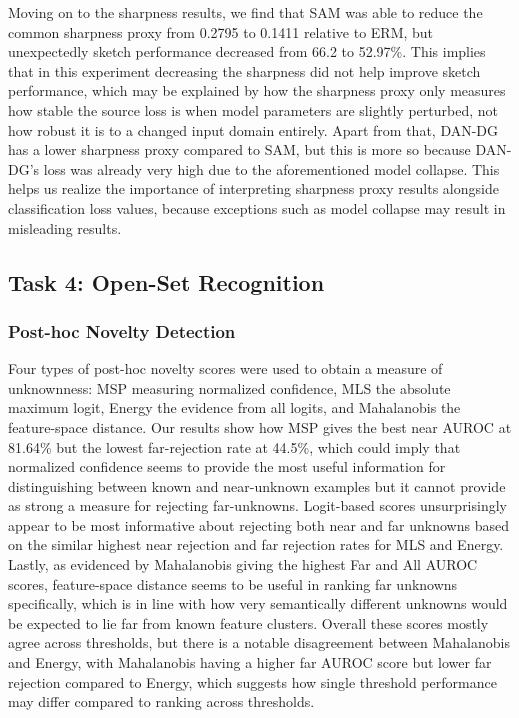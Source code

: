 \documentclass{article}
\begin{document}
Moving on to the sharpness results, we find that SAM was able to reduce the common sharpness proxy from 0.2795 to 0.1411 relative to ERM, but unexpectedly sketch performance decreased from 66.2 to 52.97\%. This implies that in this experiment decreasing the sharpness did not help improve sketch performance, which may be explained by how the sharpness proxy only measures how stable the source loss is when model parameters are slightly perturbed, not how robust it is to a changed input domain entirely. Apart from that, DAN-DG has a lower sharpness proxy compared to SAM, but this is more so because DAN-DG's loss was already very high due to the aforementioned model collapse. This helps us realize the importance of interpreting sharpness proxy results alongside classification loss values, because exceptions such as model collapse may result in misleading results.



\subsection{Task 4: Open-Set Recognition}
\label{subsec:results-task4}

\subsubsection{Post-hoc Novelty Detection}
\label{subsubsec:results-t4-posthoc}


Four types of post-hoc novelty scores were used to obtain a measure of unknownness: MSP measuring normalized confidence, MLS the absolute maximum logit, Energy the evidence from all logits, and Mahalanobis the feature-space distance. Our results show how MSP gives the best near AUROC at 81.64\% but the lowest far-rejection rate at 44.5\%, which could imply that normalized confidence seems to provide the most useful information for distinguishing between known and near-unknown examples but it cannot provide as strong a measure for rejecting far-unknowns. Logit-based scores unsurprisingly appear to be most informative about rejecting both near and far unknowns based on the similar highest near rejection and far rejection rates for MLS and Energy. Lastly, as evidenced by Mahalanobis giving the highest Far and All AUROC scores, feature-space distance seems to be useful in ranking far unknowns specifically, which is in line with how very semantically different unknowns would be expected to lie far from known feature clusters. Overall these scores mostly agree across thresholds, but there is a notable disagreement between Mahalanobis and Energy, with Mahalanobis having a higher far AUROC score but lower far rejection compared to Energy, which suggests how single threshold performance may differ compared to ranking across thresholds.
\end{document}
